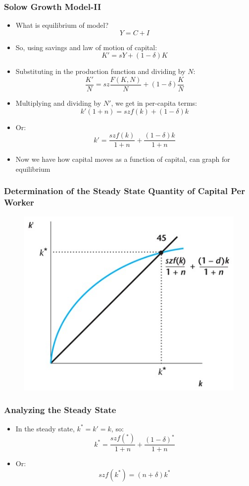 \documentclass{beamer}
\begin{document}
\begin{frame}
\frametitle[alignment=center]{Solow Growth Model-II}
\begin{itemize}
\item What is equilibrium of model?  
$$Y=C+I$$
\item So, using savings and law of motion of capital:
$$K'=sY+(1-\delta)K$$
\item Substituting in the production function and dividing by $N$:
$$\frac{K'}{N}=sz\frac{F(K,N)}{N}+(1-\delta)\frac{K}{N}$$
\item Multiplying and dividing by $N'$, we get in per-capita terms:
$$k'(1+n)=szf(k)+(1-\delta)k$$
\item Or:
$$k'=\frac{szf(k)}{1+n}+\frac{(1-\delta)k}{1+n}$$
\item Now we have how capital moves as a function of capital, can graph for equilibrium
\end{itemize}
\end{frame}


\begin{frame}
\frametitle[alignment=center]{Determination of the Steady State Quantity of Capital Per Worker}
\begin{figure}
\centering
\includegraphics[scale=0.5]{Figures/W_Fig_7pt13.png}
\end{figure}
\end{frame}

\begin{frame}
\frametitle[alignment=center]{Analyzing the Steady State}
\begin{itemize}
\item In the steady state, $k^*=k'=k$, so:
$$k^*=\frac{szf(^*)}{1+n}+\frac{(1-\delta)^*}{1+n}$$
\item Or:
$$szf(k^*)=(n+\delta)k^*$$
\end{itemize}
\end{frame}
\end{document}
